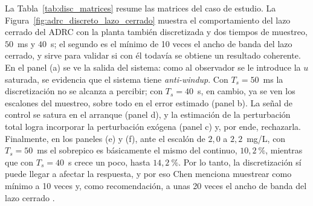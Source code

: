 La Tabla~\ref{tab:disc_matrices} resume las matrices del caso de estudio. La
Figura~\ref{fig:adrc_discreto_lazo_cerrado} muestra el comportamiento del lazo cerrado del ADRC
con la planta también discretizada y dos tiempos de muestreo, $50$~ms y $40$~s; el segundo es el
mínimo de 10 veces el ancho de banda del lazo cerrado, y sirve para validar si con él todavía se
obtiene un resultado coherente. En el panel (a) se ve la salida del sistema: como al observador
se le introduce la $u$ saturada, se evidencia que el sistema tiene \emph{anti-windup}. Con
$T_s = 50$~ms la discretización no se alcanza a percibir; con $T_s = 40$~s, en cambio, ya se ven
los escalones del muestreo, sobre todo en el error estimado (panel b). La señal de control se
satura en el arranque (panel d), y la estimación de la perturbación total logra incorporar la
perturbación exógena (panel c) y, por ende, rechazarla. Finalmente, en los paneles (e) y (f),
ante el escalón de $2{,}0$ a $2{,}2$~mg/L, con $T_s = 50$~ms el sobrepico es básicamente el mismo
del continuo, $10{,}2~\%$, mientras que con $T_s = 40$~s crece un poco, hasta $14{,}2~\%$. Por lo
tanto, la discretización sí puede llegar a afectar la respuesta, y por eso Chen menciona muestrear como mínimo a 10 veces y, como recomendación,
a unas 20 veces el ancho de banda del lazo cerrado \cite[sec.~13.3.1]{chen1993analog}.


